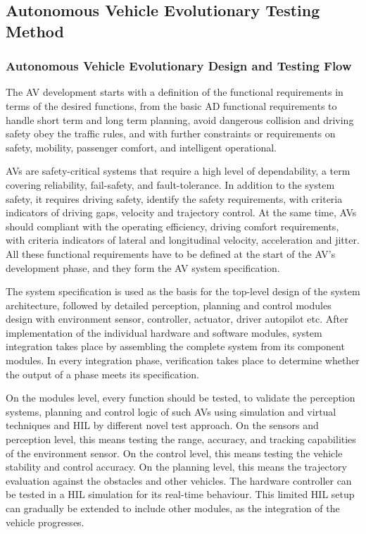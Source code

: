 \documentclass[a4paper, 10pt]{article}
\begin{document}
\subsection{Autonomous Vehicle Evolutionary Testing Method}
\subsubsection{Autonomous Vehicle Evolutionary Design and Testing Flow}
The AV development starts with a definition of the functional requirements in terms of the desired functions, from the basic AD functional requirements to handle short term and long term planning, avoid dangerous collision and driving safety obey the traffic rules, and with further constraints or requirements on safety, mobility, passenger comfort, and intelligent operational. 

AVs are safety-critical systems that require a high level of dependability, a term covering reliability, fail-safety, and fault-tolerance. In addition to the system safety, it requires driving safety, identify the safety requirements, with criteria indicators of driving gaps, velocity and trajectory control. At the same time, AVs should compliant with the operating efficiency, driving comfort requirements, with criteria indicators of lateral and longitudinal velocity, acceleration and jitter. All these functional requirements have to be defined at the start of the AV's development phase, and they form the AV system specification.

The system specification is used as the basis for the top-level design of the system architecture, followed by detailed perception, planning and control modules design with environment sensor, controller, actuator, driver autopilot etc. After implementation of the individual hardware and software modules, system integration takes place by assembling the complete system from its component modules. In every integration phase, verification takes place to determine whether the output of a phase meets its specification.

On the modules level, every function should be tested, to validate the perception systems, planning and control logic of such AVs using simulation and virtual techniques and HIL by different novel test approach. On the sensors and perception level, this means testing the range, accuracy, and tracking capabilities of the environment sensor. On the control level, this means testing the vehicle stability and control accuracy. On the planning level, this means the trajectory evaluation against the obstacles and other vehicles. The hardware controller can be tested in a HIL simulation for its real-time behaviour. This limited HIL setup can gradually be extended to include other modules, as the integration of the vehicle progresses.
\end{document}

